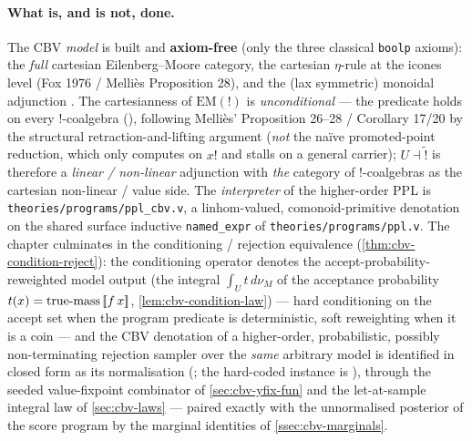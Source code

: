 \paragraph{What is, and is not, done.}
The CBV \emph{model} is built and \textbf{axiom-free} (only the three
classical \texttt{boolp} axioms): the \emph{full} cartesian
Eilenberg--Moore category, the cartesian $\eta$-rule at the icones level
(Fox 1976 / Melli\`es Proposition 28), and the (lax symmetric) monoidal
adjunction . The
cartesianness of $\mathrm{EM}(\mathord{!})$ is \emph{unconditional} ---
the predicate  holds on every
$\mathord{!}$-coalgebra (),
following Melli\`es' Proposition 26--28 / Corollary 17/20 by the
structural retraction-and-lifting argument (\emph{not} the naïve
promoted-point reduction, which only computes on $x!$ and stalls on a
general carrier); $U \dashv \widetilde{\mathord{!}}$ is therefore a
\emph{linear / non-linear} adjunction with \emph{the} category of
$\mathord{!}$-coalgebras as the cartesian non-linear / value side. The
\emph{interpreter} of the higher-order PPL is
\texttt{theories/programs/ppl\_cbv.v}, a linhom-valued, comonoid-primitive
denotation on the shared surface inductive \texttt{named\_expr} of
\texttt{theories/programs/ppl.v}. The chapter culminates in the
conditioning / rejection equivalence
(\autoref{thm:cbv-condition-reject}): the conditioning operator
denotes the accept-probability-reweighted model output
(the integral $\int_U t\,d\nu_M$ of the acceptance probability
$t(x) = \mathrm{true\text{-}mass}\,[\![ f\,x ]\!]$,
\autoref{lem:cbv-condition-law}) --- hard conditioning on the accept
set when the program predicate is deterministic, soft reweighting when
it is a coin --- and the CBV denotation of a
higher-order, probabilistic, possibly non-terminating rejection
sampler over the \emph{same} arbitrary model is identified in closed
form as its normalisation
(;
the hard-coded instance is
),
through the seeded value-fixpoint combinator of
\autoref{sec:cbv-yfix-fun} and the let-at-sample integral law of
\autoref{sec:cbv-laws} --- paired exactly with the unnormalised
posterior of the score program by the marginal identities of
\autoref{ssec:cbv-marginals}.

